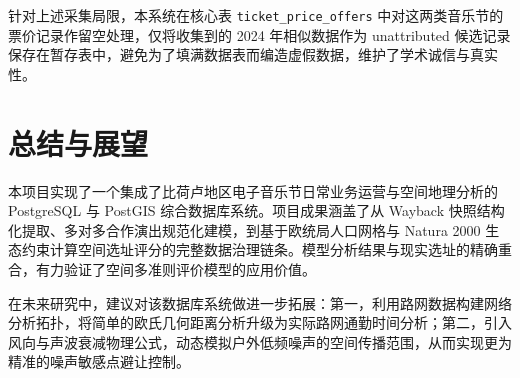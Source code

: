 \documentclass[11pt,a4paper,fontset=fandol]{ctexart}
\begin{document}
针对上述采集局限，本系统在核心表 \texttt{ticket\_price\_offers} 中对这两类音乐节的票价记录作留空处理，仅将收集到的 2024 年相似数据作为 unattributed 候选记录保存在暂存表中，避免为了填满数据表而编造虚假数据，维护了学术诚信与真实性。
\section{总结与展望}

本项目实现了一个集成了比荷卢地区电子音乐节日常业务运营与空间地理分析的 PostgreSQL 与 PostGIS 综合数据库系统。项目成果涵盖了从 Wayback 快照结构化提取、多对多合作演出规范化建模，到基于欧统局人口网格与 Natura 2000 生态约束计算空间选址评分的完整数据治理链条。模型分析结果与现实选址的精确重合，有力验证了空间多准则评价模型的应用价值。

在未来研究中，建议对该数据库系统做进一步拓展：第一，利用路网数据构建网络分析拓扑，将简单的欧氏几何距离分析升级为实际路网通勤时间分析；第二，引入风向与声波衰减物理公式，动态模拟户外低频噪声的空间传播范围，从而实现更为精准的噪声敏感点避让控制。



\end{document}
